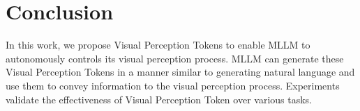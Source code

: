\section{Conclusion}

In this work, we propose Visual Perception Tokens to enable MLLM to autonomously controls its visual perception process. MLLM can generate these Visual Perception Tokens in a manner similar to generating natural language and use them to convey information to the visual perception process. 
Experiments validate the effectiveness of Visual Perception Token over various tasks.